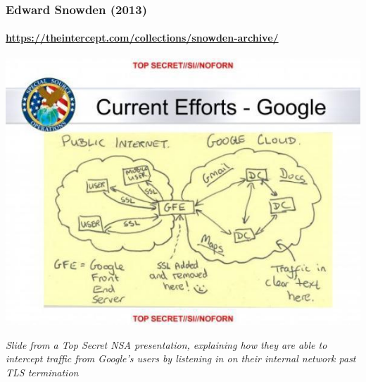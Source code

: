 \documentclass[aspectratio=169,usenames,dvipsnames]{beamer}
\begin{document}
\begin{frame}[c]
  \frametitle{Edward Snowden (2013)}
  \framesubtitle{\url{https://theintercept.com/collections/snowden-archive/}}

  \centering

  \includegraphics[width=\textwidth,height=0.6\textheight,keepaspectratio]{img/snowden_smiley.jpg}

  \emph{Slide from a Top Secret NSA presentation, explaining how they are able
  to intercept traffic from Google's users by listening in on their internal
  network past TLS termination}

\end{frame}
\end{document}
